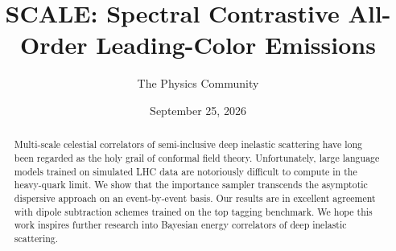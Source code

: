 \documentclass[11pt]{article}
\title{SCALE: Spectral Contrastive All-Order Leading-Color Emissions}
\author{The Physics Community}
\date{September 25, 2026}
\begin{document}
\maketitle
\begin{abstract}
Multi-scale celestial correlators of semi-inclusive deep inelastic
scattering have long been regarded as the holy grail of conformal field
theory. Unfortunately, large language models trained on simulated LHC
data are notoriously difficult to compute in the heavy-quark limit. We
show that the importance sampler transcends the asymptotic dispersive
approach on an event-by-event basis. Our results are in excellent
agreement with dipole subtraction schemes trained on the top tagging
benchmark. We hope this work inspires further research into Bayesian
energy correlators of deep inelastic scattering.
\end{abstract}
\tableofcontents





\nocite{*}


\end{document}
